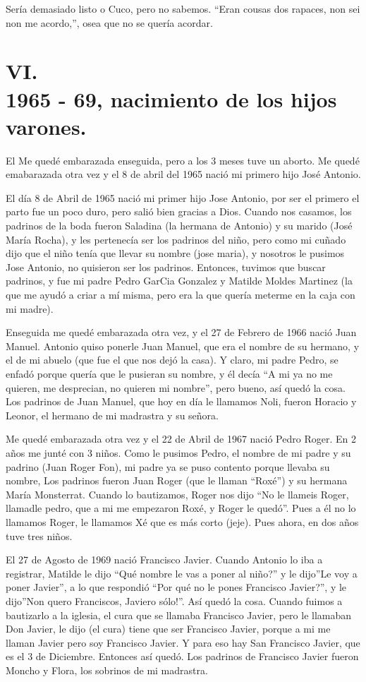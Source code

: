\documentclass[12pt,a5paper]{book}
\begin{document}
Sería demasiado listo o Cuco, pero no sabemos. “Eran cousas dos rapaces, non sei non me acordo,”, osea que no se quería acordar.


\section*{VI.\\1965 - 69, nacimiento de los hijos varones.}

El Me quedé embarazada enseguida, pero a los 3 meses tuve un aborto. Me quedé emabarazada otra vez y el 8 de abril del 1965 nació mi primero hijo José Antonio.

El día 8 de Abril de 1965 nació mi primer hijo Jose Antonio, por ser el primero el parto fue un poco duro, pero salió bien gracias a Dios. Cuando nos casamos, los padrinos de la boda fueron Saladina (la hermana de Antonio) y su marido (José María Rocha), y les pertenecía ser los padrinos del niño, pero como mi cuñado dijo que el niño tenía que llevar su nombre (jose maria), y nosotros le pusimos Jose Antonio, no quisieron ser los padrinos. Entonces, tuvimos que buscar padrinos, y fue mi padre Pedro GarCia Gonzalez y Matilde Moldes Martinez (la que me ayudó a criar a mí misma, pero era la que quería meterme en la caja con mi madre). 

Enseguida me quedé embarazada otra vez, y el 27 de Febrero de 1966 nació Juan Manuel. Antonio quiso ponerle Juan Manuel, que era el nombre de su hermano, y el de mi abuelo (que fue el que nos dejó la casa). Y claro, mi padre Pedro, se enfadó porque quería que le pusieran su nombre, y él decía “A mi ya no me quieren, me desprecian, no quieren mi nombre”, pero bueno, así quedó la cosa. Los padrinos de Juan Manuel, que hoy en día le llamamos Noli, fueron Horacio y Leonor, el hermano de mi madrastra y su señora.

Me quedé embarazada otra vez y el 22 de Abril de 1967 nació Pedro Roger. En 2 años me junté con 3 niños. Como le pusimos Pedro, el nombre de mi padre y su padrino (Juan Roger Fon), mi padre ya se puso contento porque llevaba su nombre, Los padrinos fueron Juan Roger (que le llaman “Roxé”) y su hermana María Monsterrat. Cuando lo bautizamos, Roger nos dijo “No le llameis Roger, llamadle pedro, que a mi me empezaron Roxé, y Roger le quedó”. Pues a él no lo llamamos Roger, le llamamos Xé que es más corto (jeje).  Pues ahora, en dos años tuve tres niños.

 El 27 de Agosto de 1969 nació Francisco Javier.  Cuando Antonio lo iba a registrar, Matilde le dijo “Qué nombre le vas a poner al niño?” y le dijo”Le voy a poner Javier”, a lo que respondió “Por qué no le pones Francisco Javier?”, y le dijo”Non quero Franciscos, Javiero sólo!”. Así quedó la cosa. Cuando fuimos a bautizarlo a la iglesia, el cura que se llamaba Francisco Javier, pero le llamaban Don Javier, le dijo (el cura) tiene que ser Francisco Javier, porque a mi me llaman Javier pero soy Francisco Javier. Y para eso hay San Francisco Javier, que es el 3 de Diciembre. Entonces así quedó. Los padrinos de Francisco Javier fueron Moncho y Flora, los sobrinos de mi madrastra.
\end{document}

